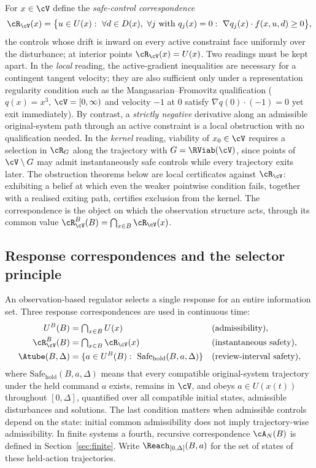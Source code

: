 For $x\in\cV$ define the \emph{safe-control correspondence}
\begin{equation}\label{eq:R}
\cR_\cV(x)=\bigl\{u\in U(x):\ \forall d\in D(x),\ \forall j\text{ with }q_j(x)=0:\ \nabla q_j(x)\cdot f(x,u,d)\ge0\bigr\},
\end{equation}
the controls whose drift is inward on every active constraint face uniformly over the disturbance; at interior points $\cR_\cV(x)=U(x)$. Two readings must be kept apart. In the \emph{local} reading, the active-gradient inequalities are necessary for a contingent tangent velocity; they are also sufficient only under a representation regularity condition such as the Mangasarian--Fromovitz qualification ($q(x)=x^3$, $\cV=[0,\infty)$ and velocity $-1$ at $0$ satisfy $\nabla q(0)\cdot(-1)=0$ yet exit immediately). By contrast, a \emph{strictly negative} derivative along an admissible original-system path through an active constraint is a local obstruction with no qualification needed. In the \emph{kernel} reading, viability of $x_0\in\cV$ requires a selection in $\cR_G$ along the trajectory with $G=\RViab(\cV)$, since points of $\cV\setminus G$ may admit instantaneously safe controls while every trajectory exits later. The obstruction theorems below are local certificates against $\cR_\cV$: exhibiting a belief at which even the weaker pointwise condition fails, together with a realised exiting path, certifies exclusion from the kernel. The correspondence is the object on which the observation structure acts, through its common value $\cR^B_\cV(B)=\bigcap_{x\in B}\cR_\cV(x)$.

\subsection{Response correspondences and the selector principle}\label{sec:selector}

An observation-based regulator selects a single response for an entire information set. Three response correspondences are used in continuous time:
\begin{align*}
U^B(B)&=\textstyle\bigcap_{x\in B}U(x) &&\text{(admissibility)},\\
\cR^B_\cV(B)&=\textstyle\bigcap_{x\in B}\cR_\cV(x) &&\text{(instantaneous safety)},\\
\Atube(B,\Delta)&=\{a\in U^B(B):\ \mathrm{Safe}_{\mathrm{hold}}(B,a,\Delta)\} &&\text{(review-interval safety)},
\end{align*}
where $\mathrm{Safe}_{\mathrm{hold}}(B,a,\Delta)$ means that every compatible original-system trajectory under the held command $a$ exists, remains in $\cV$, and obeys $a\in U(x(t))$ throughout $[0,\Delta]$, quantified over all compatible initial states, admissible disturbances and solutions. The last condition matters when admissible controls depend on the state: initial common admissibility does not imply trajectory-wise admissibility. In finite systems a fourth, recursive correspondence $\cA_N(B)$ is defined in Section~\ref{sec:finite}. Write $\Reach_{[0,\Delta]}(B,a)$ for the set of states of these held-action trajectories.


